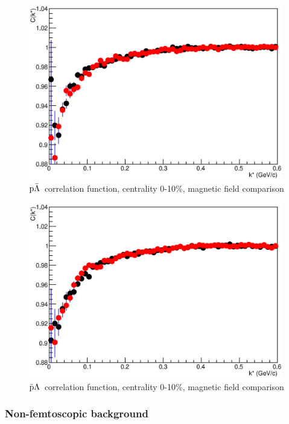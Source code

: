 \documentclass[ALICE,manyauthors]{ALICE_analysis_notes}
\newcommand{\pal}{$\rm p\bar{\rm \Lambda}$}
\newcommand{\apl}{$\bar{\rm p }\Lambda$}
\begin{document}
\begin{figure}[]
   \centering
   \includegraphics[width=0.99\textwidth]{pics/compPAL}
   \caption{ \pal~correlation function, centrality 0-10$\%$, magnetic field comparison}
   \label{fig:palCorrFun}
 \end{figure}

\begin{figure}[]
   \centering
   \includegraphics[width=0.99\textwidth]{pics/compAPL}
   \caption{ \apl~correlation function, centrality 0-10$\%$, magnetic field comparison}
   \label{fig:aplCorrFun}
 \end{figure}

\subsubsection{Non-femtoscopic background}
\end{document}

